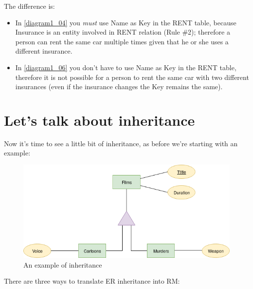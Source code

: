 \documentclass[class=book, crop=false, oneside]{standalone}
\begin{document}
The difference is:
\begin{itemize}
	\item In \ref{diagram1_04} you \emph{must} use Name as Key in the RENT table, because Insurance is an entity involved in RENT relation (Rule \#2); therefore a person can rent the same car multiple times given that he or she uses a different insurance.\\
	\item In \ref{diagram1_06} you don't have to use Name as Key in the RENT table, therefore it is not possible for a person to rent the same car with two different insurances (even if the insurance changes the Key remains the same).
\end{itemize}
\newpage

\section{Let's talk about inheritance}
Now it's time to see a little bit of inheritance, as before we're starting with an example:
\begin{figure}[H]
	\includegraphics[width=\textwidth,keepaspectratio]{diagram2_00.png}
	\caption{An example of inheritance}
	\label{diagram2_00}
\end{figure}
There are three ways to translate ER inheritance into RM:
\end{document}
